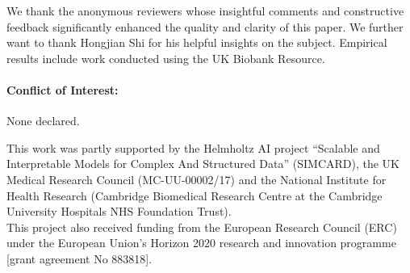 \documentclass[ejs,noshowframe]{imsart}
\theoremstyle{plain}
\begin{document}

\begin{acks}[Acknowledgments]
    We thank the anonymous reviewers whose insightful comments and constructive feedback significantly enhanced the quality and clarity of this paper. We further want to thank Hongjian Shi for his helpful insights on the subject. Empirical results include work conducted using the UK Biobank Resource. \\

    \paragraph{Conflict of Interest:} None declared.
\end{acks}


\begin{funding}
    This work was partly supported by the Helmholtz AI project
    ``Scalable and Interpretable Models for Complex And Structured Data'' (SIMCARD), the UK Medical Research Council (MC-UU-00002/17) and the National Institute for Health Research (Cambridge Biomedical Research Centre at the Cambridge University Hospitals NHS Foundation Trust).
    \\

    \noindent This project also received funding from the European Research Council (ERC) under the European Union’s Horizon 2020 research and innovation programme [grant agreement No 883818].

\end{funding}

\end{document}
